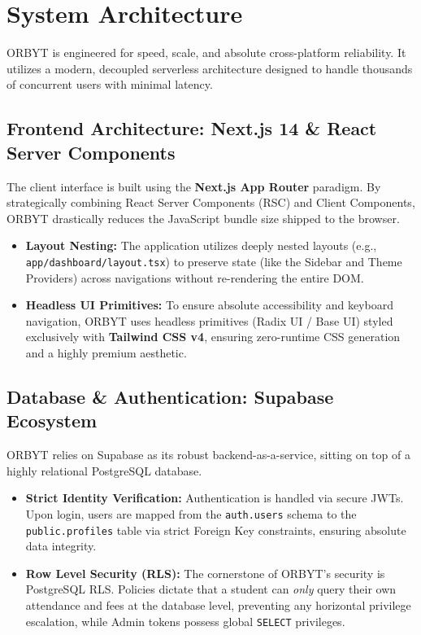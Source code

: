 \documentclass[11pt,a4paper]{article}
\begin{document}
\section{System Architecture}

ORBYT is engineered for speed, scale, and absolute cross-platform reliability. It utilizes a modern, decoupled serverless architecture designed to handle thousands of concurrent users with minimal latency.

\subsection{Frontend Architecture: Next.js 14 \& React Server Components}
The client interface is built using the \textbf{Next.js App Router} paradigm. By strategically combining React Server Components (RSC) and Client Components, ORBYT drastically reduces the JavaScript bundle size shipped to the browser. 
\begin{itemize}
    \item \textbf{Layout Nesting:} The application utilizes deeply nested layouts (e.g., \texttt{app/dashboard/layout.tsx}) to preserve state (like the Sidebar and Theme Providers) across navigations without re-rendering the entire DOM.
    \item \textbf{Headless UI Primitives:} To ensure absolute accessibility and keyboard navigation, ORBYT uses headless primitives (Radix UI / Base UI) styled exclusively with \textbf{Tailwind CSS v4}, ensuring zero-runtime CSS generation and a highly premium aesthetic.
\end{itemize}

\subsection{Database \& Authentication: Supabase Ecosystem}
ORBYT relies on Supabase as its robust backend-as-a-service, sitting on top of a highly relational PostgreSQL database.
\begin{itemize}
    \item \textbf{Strict Identity Verification:} Authentication is handled via secure JWTs. Upon login, users are mapped from the \texttt{auth.users} schema to the \texttt{public.profiles} table via strict Foreign Key constraints, ensuring absolute data integrity.
    \item \textbf{Row Level Security (RLS):} The cornerstone of ORBYT's security is PostgreSQL RLS. Policies dictate that a student can \textit{only} query their own attendance and fees at the database level, preventing any horizontal privilege escalation, while Admin tokens possess global \texttt{SELECT} privileges.
\end{itemize}
\end{document}
